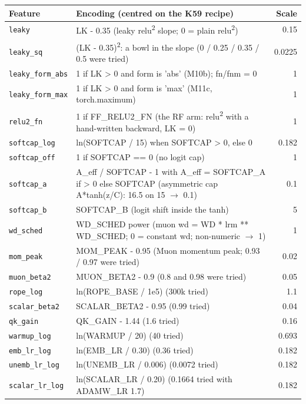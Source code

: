 {\scriptsize
\begin{tabular}{@{}lp{10.6cm}r@{}}
\toprule
Feature & Encoding (centred on the K59 recipe) & Scale \\
\midrule
\texttt{leaky} & LK - 0.35 (leaky relu\textsuperscript{2} slope; 0 = plain relu\textsuperscript{2}) & 0.15 \\
\texttt{leaky\_sq} & (LK - 0.35)\textsuperscript{2}: a bowl in the slope (0 / 0.25 / 0.35 / 0.5 were tried) & 0.0225 \\
\texttt{leaky\_form\_abs} & 1 if LK > 0 and form is 'abs' (M10b); fn/fnm = 0 & 1 \\
\texttt{leaky\_form\_max} & 1 if LK > 0 and form is 'max' (M11c, torch.maximum) & 1 \\
\texttt{relu2\_fn} & 1 if FF\_RELU2\_FN (the RF arm: relu\textsuperscript{2} with a hand-written backward, LK = 0) & 1 \\
\texttt{softcap\_log} & ln(SOFTCAP / 15) when SOFTCAP > 0, else 0 & 0.182 \\
\texttt{softcap\_off} & 1 if SOFTCAP == 0 (no logit cap) & 1 \\
\texttt{softcap\_a} & A\_eff / SOFTCAP - 1 with A\_eff = SOFTCAP\_A if > 0 else SOFTCAP (asymmetric cap A*tanh(z/C): 16.5 on 15 $\rightarrow$ 0.1) & 0.1 \\
\texttt{softcap\_b} & SOFTCAP\_B (logit shift inside the tanh) & 5 \\
\texttt{wd\_sched} & WD\_SCHED power (muon wd = WD * lrm ** WD\_SCHED; 0 = constant wd; non-numeric $\rightarrow$ 1) & 1 \\
\texttt{mom\_peak} & MOM\_PEAK - 0.95 (Muon momentum peak; 0.93 / 0.97 were tried) & 0.02 \\
\texttt{muon\_beta2} & MUON\_BETA2 - 0.9 (0.8 and 0.98 were tried) & 0.05 \\
\texttt{rope\_log} & ln(ROPE\_BASE / 1e5) (300k tried) & 1.1 \\
\texttt{scalar\_beta2} & SCALAR\_BETA2 - 0.95 (0.99 tried) & 0.04 \\
\texttt{qk\_gain} & QK\_GAIN - 1.44 (1.6 tried) & 0.16 \\
\texttt{warmup\_log} & ln(WARMUP / 20) (40 tried) & 0.693 \\
\texttt{emb\_lr\_log} & ln(EMB\_LR / 0.30) (0.36 tried) & 0.182 \\
\texttt{unemb\_lr\_log} & ln(UNEMB\_LR / 0.006) (0.0072 tried) & 0.182 \\
\texttt{scalar\_lr\_log} & ln(SCALAR\_LR / 0.20) (0.1664 tried with ADAMW\_LR 1.7) & 0.182 \\

\end{tabular}}
